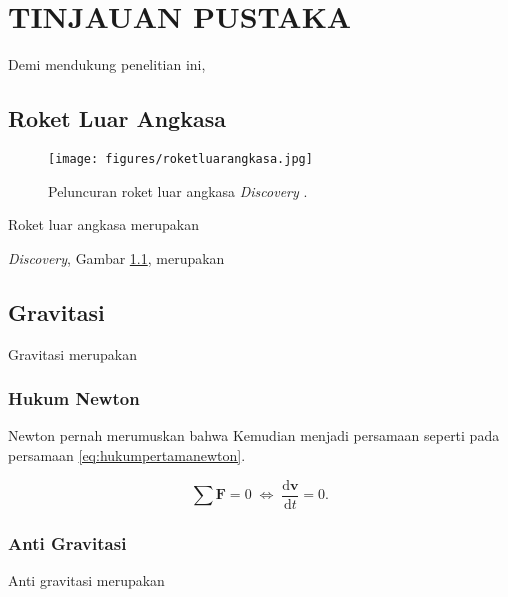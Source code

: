 \chapter{TINJAUAN PUSTAKA}
\label{chap:tinjauanpustaka}


Demi mendukung penelitian ini, \lipsum[1][1-5]

\section{Roket Luar Angkasa}
\label{sec:roketluarangkasa}

\begin{figure}[ht]
  \centering

  \texttt{[image: figures/roketluarangkasa.jpg]}

  \caption{Peluncuran roket luar angkasa \emph{Discovery} \parencite{roketluarangkasa}.}
  \label{fig:roketluarangkasa}
\end{figure}

Roket luar angkasa merupakan \lipsum[1]

\emph{Discovery}, Gambar \ref{fig:roketluarangkasa}, merupakan \lipsum[2]

\section{Gravitasi}
\label{sec:gravitasi}

Gravitasi merupakan \lipsum[1]

\subsection{Hukum Newton}
\label{subsec:hukumnewton}

Newton \parencite{newton1687} pernah merumuskan bahwa \lipsum[1]
Kemudian menjadi persamaan seperti pada persamaan \ref{eq:hukumpertamanewton}.

\begin{equation}
  \label{eq:hukumpertamanewton}
  \sum \mathbf{F} = 0\; \Leftrightarrow\; \frac{\mathrm{d} \mathbf{v} }{\mathrm{d}t} = 0.
\end{equation}

\subsection{Anti Gravitasi}
\label{subsec:antigravitasi}

Anti gravitasi merupakan \lipsum[1]
